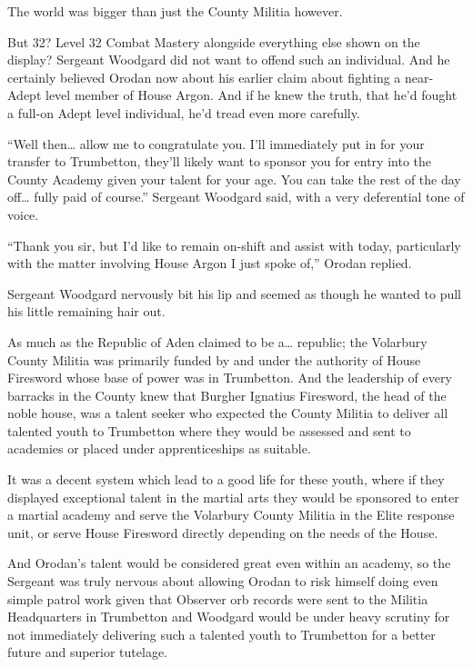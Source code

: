 \documentclass[a4paper,10pt]{book}
\begin{document}
The world was bigger than just the County Militia however.\par
But 32? Level 32 Combat Mastery alongside everything else shown on the display? Sergeant Woodgard did not want to offend such an individual. And he certainly believed Orodan now about his earlier claim about fighting a near-Adept level member of House Argon. And if he knew the truth, that he’d fought a full-on Adept level individual, he’d tread even more carefully.\par
“Well then… allow me to congratulate you. I’ll immediately put in for your transfer to Trumbetton, they’ll likely want to sponsor you for entry into the County Academy given your talent for your age. You can take the rest of the day off… fully paid of course.” Sergeant Woodgard said, with a very deferential tone of voice.\par
“Thank you sir, but I’d like to remain on-shift and assist with today, particularly with the matter involving House Argon I just spoke of,” Orodan replied.\par
Sergeant Woodgard nervously bit his lip and seemed as though he wanted to pull his little remaining hair out.\par
As much as the Republic of Aden claimed to be a… republic; the Volarbury County Militia was primarily funded by and under the authority of House Firesword whose base of power was in Trumbetton. And the leadership of every barracks in the County knew that Burgher Ignatius Firesword, the head of the noble house, was a talent seeker who expected the County Militia to deliver all talented youth to Trumbetton where they would be assessed and sent to academies or placed under apprenticeships as suitable.\par
It was a decent system which lead to a good life for these youth, where if they displayed exceptional talent in the martial arts they would be sponsored to enter a martial academy and serve the Volarbury County Militia in the Elite response unit, or serve House Firesword directly depending on the needs of the House.\par
And Orodan’s talent would be considered great even within an academy, so the Sergeant was truly nervous about allowing Orodan to risk himself doing even simple patrol work given that Observer orb records were sent to the Militia Headquarters in Trumbetton and Woodgard would be under heavy scrutiny for not immediately delivering such a talented youth to Trumbetton for a better future and superior tutelage.\par
\end{document}
